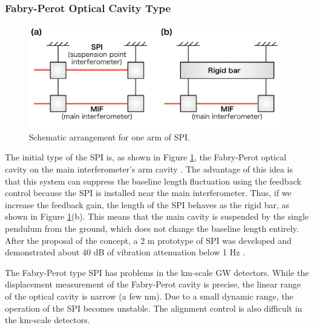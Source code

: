 \subsubsection{Fabry-Perot Optical Cavity Type }
\begin{figure}[h]
  \begin{center}   
    \includegraphics[width=13cm]{./img_chap5/img508.png}
    \caption{Schematic arrangement for one arm of SPI.} \label{img:img508}
  \end{center}
\end{figure}
The initial type of the SPI is, as shown in Figure \ref{img:img508}, the Fabry-Perot optical cavity on the main interferometer's arm cavity \cite{drever2002extension}. The advantage of this idea is that this system can suppress the baseline length fluctuation using the feedback control because the SPI is installed near the main interferometer. Thus, if we increase the feedback gain, the length of the SPI behaves as the rigid bar, as shown in Figure \ref{img:img508}(b). This means that the main cavity is suspended by the single pendulum from the ground, which does not change the baseline length entirely. After the proposal of the concept, a 2 m prototype of SPI was developed and demonstrated about 40 dB of vibration attenuation below 1 Hz \cite{aso2004stabilization}.

The Fabry-Perot type SPI has problems in the km-scale GW detectors. While the displacement measurement of the Fabry-Perot cavity is precise, the linear range of the optical cavity is narrow (a few nm). Due to a small dynamic range, the operation of the SPI becomes unstable. The alignment control is also difficult in the km-scale detectors.

